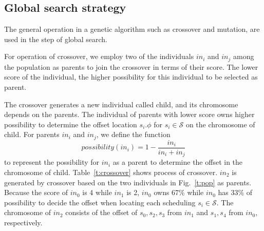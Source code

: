 \documentclass[journal]{IEEEtran}
\newcommand{\calS}{\mathcal{S}}
\theoremstyle{remark}
\begin{document}
\subsection{Global search strategy \label{s:glo}}

The general operation in a genetic algorithm such as crossover and mutation,
  are used in the step of global search. 

For operation of crossover,
 we employ two of the individuals $in_i$ and $in_j$ among the population as parents to join the crossover in terms of their score.
The lower score of the individual,
 the higher possibility for this individual to be selected as parent.
 
The crossover generates a new individual called child, and its chromosome depends on the parents.
The individual of parents with lower score owns higher possibility to determine the offset location $s_i.\phi$ for $s_i\in\calS$ on the chromosome of child.
For parents $in_i$ and $in_j$, we define the function
\begin{equation}
	possibility(in_i)=1-\frac{in_i}{in_i+in_j}
\end{equation}
to represent the possibility for $in_i$ as a parent to determine the offset in the chromosome of child.
Table~\ref{t:crossover} shows process of crossover.
$in_2$ is generated by crossover based on the two individuals in Fig.~\ref{t:pop} as parents.
Because the score of $in_0$ is 4 while $in_1$ is 2,
 $in_0$ owns 67\% while $in_0 $ has 33\% of possibility to decide the offset when locating each scheduling $s_i\in\calS$.
The chromosome of $in_2$ consists of the offset of $s_0,s_2,s_3$ from $in_1$ and $s_1,s_4$ from $in_0$, respectively.
\end{document}

